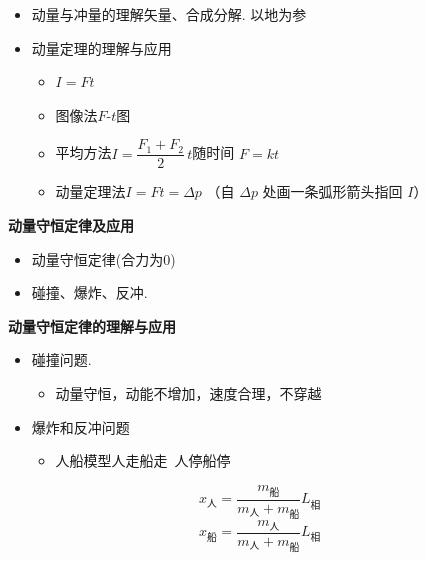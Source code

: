 \begin{itemize}
\item 动量与冲量的理解\quad 矢量、合成分解. 以地为参 %
\item 动量定理的理解与应用
  \begin{itemize}
  \item $I=Ft$
  \item 图像法\quad $F$-$t$图
  \item 平均方法\quad $I=\dfrac{F_1+F_2}{2}\,t$\quad 随时间 $F=kt$
  \item 动量定理法\quad $I=Ft=\Delta p$ （自 $\Delta p$ 处画一条弧形箭头指回 $I$）
  \end{itemize}
\end{itemize}
\textbf{动量守恒定律及应用}
\begin{itemize}
\item 动量守恒定律\quad (合力为0)
\item 碰撞、爆炸、反冲.
\end{itemize}
\textbf{动量守恒定律的理解与应用}
\begin{itemize}
\item 碰撞问题.
  \begin{itemize}
  \item 动量守恒，动能不增加，速度合理，不穿越
  \end{itemize}
\end{itemize}
\begin{itemize}
\item 爆炸和反冲问题
  \begin{itemize}
  \item 人船模型\quad 人走船走\ 人停船停
  \end{itemize}
\end{itemize}
\[ x_{\text{人}}=\dfrac{m_{\text{船}}}{m_{\text{人}}+m_{\text{船}}}L_{\text{相}} \]
\[ x_{\text{船}}=\dfrac{m_{\text{人}}}{m_{\text{人}}+m_{\text{船}}}L_{\text{相}} \] %
